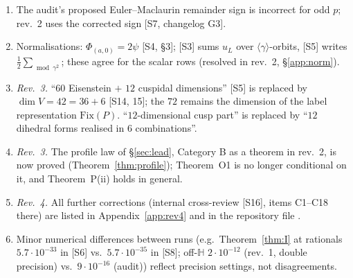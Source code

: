 \documentclass[11pt]{article}
\theoremstyle{definition}
\theoremstyle{plain}
\newcommand{\Hb}{\mathbb{H}}
\newcommand{\src}[1]{\textup{[S#1]}}
\begin{document}
\begin{enumerate}[leftmargin=2em]
\src{6}: a twisted Herglotz form exists, and the cusp rows involve $L(0)$, not $L(\tfrac12)$.
\item The audit's proposed Euler--Maclaurin remainder sign is incorrect for odd $p$; rev.~2 uses the corrected sign \src{7, changelog G3}.
\item Normalisations: $\Phi_{(a,0)}=2\psi$ \src{4, \S3}; \src{3} sums $u_L$ over $\langle\gamma\rangle$-orbits, \src{5} writes $\tfrac12\sum_{\bmod\gamma^2}$;
these agree for the scalar rows (resolved in rev.~2, \S\ref{app:norm}).
\item \emph{Rev.~3.} ``$60$ Eisenstein $+$ $12$ cuspidal dimensions'' \src{5} is replaced by $\dim V=42=36+6$ \src{14, 15}; the $72$ remains the dimension of the
label representation $\mathrm{Fix}(P)$. ``$12$-dimensional cusp part'' is replaced by ``$12$ dihedral forms realised in $6$ combinations''.
\item \emph{Rev.~3.} The profile law of \S\ref{sec:lead}, Category B as a theorem in rev.~2, is now proved (Theorem~\ref{thm:profile}); Theorem~O1 is no longer
conditional on it, and Theorem~P(ii) holds in general.
\item \emph{Rev.~4.} All further corrections (internal cross-review \src{16}, items C1--C18 there) are listed in Appendix~\ref{app:rev4} and in the repository file
.
\item Minor numerical differences between runs (e.g.\ Theorem~\ref{thm:I} at rationals $5.7\cdot10^{-33}$ in \src{6} vs.\ $5.7\cdot10^{-35}$ in \src{8};
off-$\Hb$ $2\cdot10^{-12}$ (rev.~1, double precision) vs.\ $9\cdot10^{-16}$ (audit)) reflect precision settings, not disagreements.
\end{enumerate}

\end{document}
